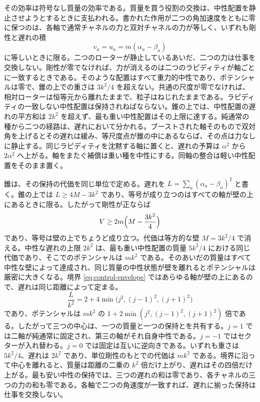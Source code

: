 \documentclass[a4paper]{article}
\begin{document}
その効率は符号なし質量の効率である。質量を買う役割の交換は、中性配置を静止させようとするときに支払われる。書かれた作用が二つの角加速度をともに零に保つのは、各軸で通常チャネルの力と双対チャネルの力が等しく、いずれも剛性と遅れの積
\[
v_a=u_a=m(\alpha_a-\beta_a)
\]
に等しいときに限る。二つのローターが静止しているあいだ、二つの力は仕事を交換しない。剛性が零でなければ、力が消えるのは二つのラピディティが軸ごとに一致するときである。そのような配置はすべて重力的中性であり、ポテンシャルは零で、錐の上での重さは $3k^2/4$ を超えない。共通の尺度が零でなければ、相対ローターは恒等元から離れたままで、粒子はねじれたままである。ラピディティの一致しない中性配置は保持されねばならない。錐の上では、中性配置の遅れの平方和は $2k^2$ を超えず、最も重い中性配置はその上限に達する。純通常の種から二つの経路は、遅れにおいて分かれる。ブーストされた軸そのもので双対角を上げるとその遅れは緩み、等尺度点が錐の中にあるならば、その点は力なしに静止する。同じラピディティを沈黙する軸に置くと、遅れの予算は $\alpha^2$ から $2\alpha^2$ へ上がる。軸をまたぐ補償は重い種を中性にする。同軸の整合は軽い中性配置をそのまま置く。

錐は、その保持の代価を同じ単位で定める。遅れを $L=\sum_a(\alpha_a-\beta_a)^2$ と書く。錐の上では $L\ge 4M-3k^2$ であり、等号が成り立つのはすべての軸が壁の上にあるときに限る。したがって剛性が正ならば
\[
V\ge 2m\Bigl(M-\frac{3k^2}{4}\Bigr)
\]
であり、等号は壁の上でちょうど成り立つ。代価は等方的な壁 $M=3k^2/4$ で消える。中性な遅れの上限 $2k^2$ は、最も重い中性配置の質量 $5k^2/4$ における同じ代価であり、そこでのポテンシャルは $mk^2$ である。そのあいだの質量はすべて中性な壁によって達成され、同じ質量の中性状態が壁を離れるとポテンシャルは厳密に大きくなる。境界 \eqref{eq:control-envelope} ではあらゆる軸が壁の上にあるので、遅れは同じ距離によって定まる。
\begin{equation}
\label{eq:hold-on-envelope}
\frac{L}{k^2}=2+4\min\bigl(j^2,(j-1)^2,(j+1)^2\bigr)
\end{equation}
であり、ポテンシャルは $mk^2$ の $1+2\min(j^2,(j-1)^2,(j+1)^2)$ 倍である。したがって三つの中心は、一つの質量と一つの保持とを共有する。$j=1$ では二軸が純通常に固定され、第三の軸がそれ自身中性である。$j=-1$ ではセクターが入れ替わる。$j=0$ では固定は互いに逆向きである。いずれも重さは $5k^2/4$、遅れは $2k^2$ であり、単位剛性のもとでの代価は $mk^2$ である。境界に沿って中心を離れると、質量は距離の二乗の $k^2$ 倍だけ上がり、遅れはその四倍だけ上がる。最も安い中性の保持では、三つの遅れの和は零であり、各チャネルの三つの力の和も零である。各軸で二つの角速度が一致すれば、遅れに揃った保持は仕事を交換しない。
\end{document}
